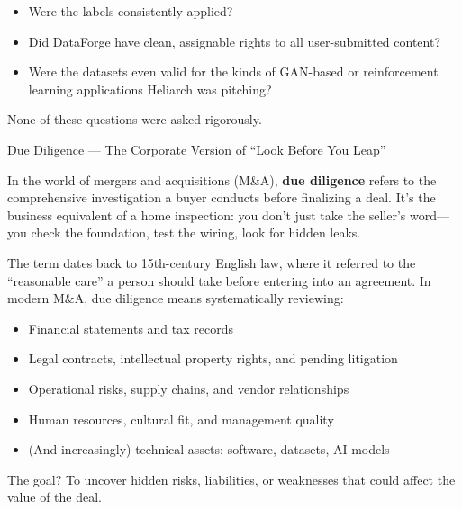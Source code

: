 \begin{itemize}
    \item Were the labels consistently applied?

    \item Did DataForge have clean, assignable rights to all user-submitted content?

    \item Were the datasets even valid for the kinds of GAN-based or reinforcement learning applications Heliarch was pitching?
\end{itemize}

None of these questions were asked rigorously.

\begin{HistoricalSidebar}{Due Diligence --- The Corporate Version of ``Look Before You Leap''}

    In the world of mergers and acquisitions (M\&A), \textbf{due diligence} refers to the comprehensive investigation a buyer conducts before finalizing a deal.  
    It’s the business equivalent of a home inspection:  
    you don’t just take the seller’s word—you check the foundation, test the wiring, look for hidden leaks.
    
    \medskip
    
    The term dates back to 15th-century English law, where it referred to the ``reasonable care'' a person should take before entering into an agreement.  
    In modern M\&A, due diligence means systematically reviewing:

    \medskip
    
    \begin{itemize}
        \item Financial statements and tax records
        \item Legal contracts, intellectual property rights, and pending litigation
        \item Operational risks, supply chains, and vendor relationships
        \item Human resources, cultural fit, and management quality
        \item (And increasingly) technical assets: software, datasets, AI models
    \end{itemize}
    
    \medskip
    
    The goal? To uncover hidden risks, liabilities, or weaknesses that could affect the value of the deal.
    
    \medskip
    

\end{HistoricalSidebar}
